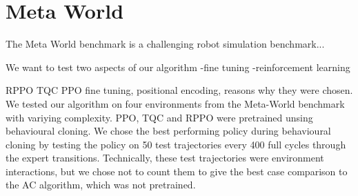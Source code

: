 \section{Meta World}
The Meta World benchmark is a challenging robot simulation benchmark...

We want to test two aspects of our algorithm
-fine tuning
-reinforcement learning

RPPO TQC PPO fine tuning, positional encoding, reasons why they were chosen.
We tested our algorithm on four environments from the Meta-World benchmark with variying complexity. 
PPO, TQC and RPPO were pretrained unsing behavioural cloning. We chose the best performing policy during behavioural cloning by testing the policy on 50 test 
trajectories every 400 full cycles through the 
expert transitions. Technically, these test trajectories were environment interactions, but we chose not to count them to give the best case comparison to the AC algorithm, which was not pretrained. 
